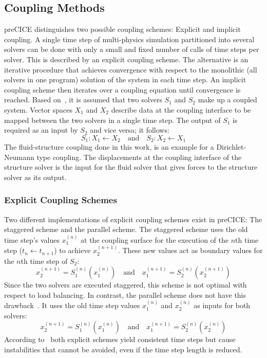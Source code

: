  \subsection{Coupling Methods}\label{sec:Coupl-Coupling}
  preCICE distinguishes two possible coupling schemes: Explicit and implicit coupling. A single time step of multi-physics simulation partitioned into several solvers can be done with only a small and fixed number of calls of time steps per solver. This is described by an explicit coupling scheme. The alternative is an iterative procedure that achieves convergence with respect to the monolithic (all solvers in one program) solution of the system in each time step. An implicit coupling scheme then iterates over a coupling equation until convergence is reached. Based on~\cite{bungartz2015fully}, it is assumed that two solvers $S_1$ and $S_2$ make up a coupled system. Vector spaces $X_1$ and $X_2$ describe data at the coupling interface to be mapped between the two solvers in a single time step. The output of $S_1$ is required as an input by $S_2$ and vice versa; it follows:
  \begin{equation}
  S_1: X_1 \leftarrow X_2\quad \text{and}\quad S_2:X_2 \leftarrow X_1
  \end{equation}
  The fluid-structure coupling done in this work, is an example for a Dirichlet-Neumann type coupling. The displacements at the coupling interface of the structure solver is the input for the fluid solver that gives forces to the structure solver as its output.
 
  \subsubsection{Explicit Coupling Schemes}\label{sec:Coupl-Coupling-Explicit}
   Two different implementations of explicit coupling schemes exist in preCICE: The staggered scheme and the parallel scheme. The staggered scheme uses the old time step's values $x_1^{(n)}$ at the coupling surface for the execution of the $n$th time step ($t_n \leftarrow t_{n+1}$) to achieve $x_2^{(n+1)}$. These new values act as boundary values for the $n$th time step of $S_2$:
   \begin{equation}
   x_2^{(n+1)} = S_1^{(n)}\left( x_1^{(n)} \right)\quad \text{and}\quad x_1^{(n+1)} = S_2^{(n)}\left( x_2^{(n+1)} \right)
   \end{equation}
   Since the two solvers are executed staggered, this scheme is not optimal with respect to load balancing. In contrast, the parallel scheme does not have this drawback~\cite{bungartz2015fully}. It uses the old time step values $x_1^{(n)}$ and $x_2^{(n)}$ as inputs for both solvers:
   \begin{equation}
   x_2^{(n+1)} = S_1^{(n)}\left( x_1^{(n)} \right)\quad \text{and}\quad x_1^{(n+1)} = S_2^{(n)}\left( x_2^{(n)} \right)
   \end{equation}
   According to~\cite{bungartz2015fully} both explicit schemes yield consistent time steps but cause instabilities that cannot be avoided, even if the time step length is reduced.
  
